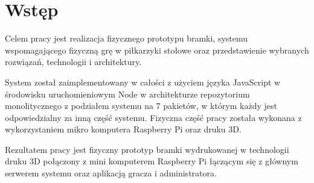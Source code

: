 \chapter{Wstęp}
\label{ch:wstęp}

Celem pracy jest realizacja fizycznego prototypu bramki, systemu wspomagającego fizyczną grę w piłkarzyki stołowe oraz przedstawienie wybranych rozwiązań, technologii i architektury.

System został zaimplementowany w całości z użyciem języka JavaScript w środowisku uruchomieniowym Node w architekturze repozytorium monolitycznego z podziałem systemu na 7 pakietów, w którym każdy jest odpowiedzialny za inną część systemu. Fizyczna część pracy została wykonana z wykorzystaniem mikro komputera Raspberry Pi oraz druku 3D.

Rezultatem pracy jest fizyczny prototyp bramki wydrukowanej w technologii druku 3D połączony z mini komputerem Raspberry Pi łączącym się z głównym serwerem systemu oraz aplikacją gracza i administratora.